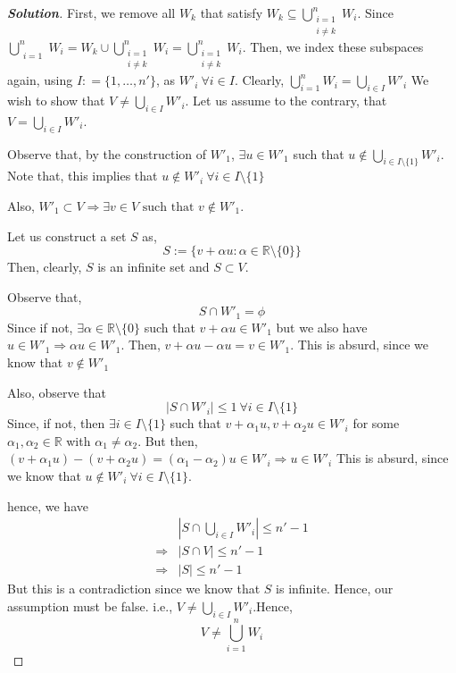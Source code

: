 \documentclass[10pt]{scrartcl}
\theoremstyle{definition}
\newenvironment{solution} {\begin{proof}[\normalfont \textbf{Solution}]} {\end{proof}}
\newcommand{\rn}{\mathbb{R}}
\begin{document}
\begin{solution}
    First, we remove all $W_k$ that satisfy $W_k \subseteq \bigcup_{\substack{i = 1\\ i \neq k}}^n W_i$.
    Since $\bigcup_{\substack{i = 1}}^n W_i = W_k \cup \bigcup_{\substack{i = 1\\ i \neq k}}^n W_i  = \bigcup_{\substack{i = 1\\ i \neq k}}^n W_i$.
    Then, we index these subspaces again, using $I : = \{1, \dots ,n'\}$, as $W'_i ~ \forall i \in I$. 
    Clearly, $\bigcup_{i = 1}^n W_i = \bigcup_{i \in I} W'_i$
    We wish to show that $V \neq \bigcup_{i \in I} W'_i$. Let us assume to the contrary, that
    $V = \bigcup_{i \in I}W'_i$. 

    Observe that, by the construction of $W'_1$, $\exists u \in W'_1$ such that $u \notin \bigcup_{i \in I \setminus \{1\}}W'_i$.
    Note that, this implies that $u \notin W'_i~\forall i \in I \setminus \{1\}$

    Also, $W'_1 \subset V \Rightarrow \exists v \in V \text{ such that } v \notin W'_1$.

    Let us construct a set $S$ as, $$S := \{v + \alpha u : \alpha \in \rn \setminus \{0\}\}$$
    Then, clearly, $S$ is an infinite set and $S \subset V$.

    Observe that, $$S \cap W'_1 = \phi$$Since if not, $\exists \alpha \in \rn \setminus \{0\}$ such that $v + \alpha u \in W'_1$ but we also have $u \in W'_1 \Rightarrow \alpha u \in W'_1$. 
    Then, $v + \alpha u - \alpha u = v \in W'_1$. This is absurd, since we know that $v \notin W'_1$

    Also, observe that $$|S \cap W'_i| \leq 1 ~ \forall i \in I \setminus \{1\}$$
    Since, if not, then $\exists i \in I \setminus \{1\}$ such that $v + \alpha_1 u, v + \alpha_2 u \in W'_i$ for some $\alpha_1, \alpha_2 \in \rn$ with $\alpha_1 \neq \alpha_2$.
    But then, $(v + \alpha_1 u) - (v + \alpha_2 u) = (\alpha_1 - \alpha_2) u\in W'_i \Rightarrow u \in W'_i$ 
    This is absurd, since we know that $u \notin W'_i ~ \forall i \in I \setminus \{1\}$.

    hence, we have 
    \begin{align*}
        & |S \cap \bigcup_{i \in I}W'_i| \leq n' - 1 \\ 
        \Rightarrow & |S \cap V| \leq n' -1 \\ 
        \Rightarrow & |S| \leq n' - 1
    \end{align*}
    But this is a contradiction since we know that $S$ is infinite. Hence, our assumption must be false. i.e.,
    $V \neq \bigcup_{i \in I}W'_i$.Hence, $$V \neq \bigcup_{i = 1}^n W_i$$
\end{solution}
\end{document}
